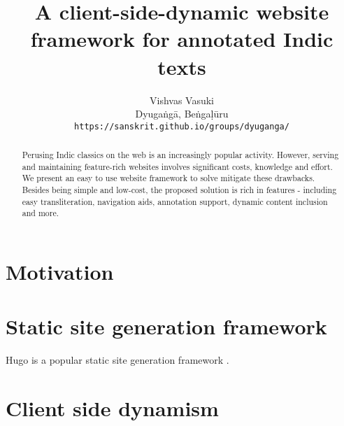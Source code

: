 \documentclass[11pt]{article}
\title{A client-side-dynamic website framework for annotated Indic texts}
\author{
  Vishvas Vasuki \\
  Dyugaṅgā, Beṅgaḷūru \\
  {\tt https://sanskrit.github.io/groups/dyuganga/}
\\}
\date{}
\begin{document}
\maketitle
\begin{abstract}
Perusing Indic classics on the web is an increasingly popular activity. However, serving and maintaining feature-rich websites involves significant costs, knowledge and effort. We present an easy to use website framework to solve mitigate these drawbacks. Besides being simple and low-cost, the proposed solution is rich in features - including easy transliteration, navigation aids, annotation support, dynamic content inclusion and more.
\end{abstract}

\section{Motivation}

\section{Static site generation framework}
Hugo is a popular static site generation framework \cite{hugo}.

\section{Client side dynamism}




\end{document}
